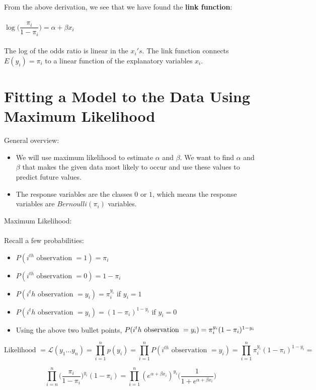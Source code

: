 \documentclass[12pt,timesnewroman,letterpaper]{article}
\begin{document}
\noindent From the above derivation, we see that we have found the \textbf{link function}:\\\\
$\log\big(\dfrac{\pi_i}{1-\pi_i}\big) = \alpha + \beta x_i$
\\\\
The log of the odds ratio is linear in the ${x_i} 's$. The link function connects $E(y_i) = \pi_i$ to a linear function of the explanatory variables $x_i$.

\section{Fitting a Model to the Data Using Maximum Likelihood}
General overview:
\begin{itemize}
    \item We will use maximum likelihood to estimate $\alpha$ and $\beta$. We want to find $\alpha$ and $\beta$ that makes the given data most likely to occur and use these values to predict future values.
    \item The response variables are the classes $0$ or $1$, which means the response variables are $Bernoulli(\pi_i)$ variables.
\end{itemize}

\noindent Maximum Likelihood:
\\
\\
Recall a few probabilities:
\begin{itemize}
    \item $P(i^{th} \text{ observation } = 1) = \pi_i$
    \item $P(i^{th} \text{ observation } = 0) = 1 - \pi_i$
    \item $P(i^th \text{ observation } = y_i) = \pi_i^{y_i}$ if $y_i = 1$
    \item $P(i^th \text{ observation } = y_i) = (1-\pi_i)^{1-y_i}$ if $y_i = 0$
    \item Using the above two bullet points, $P(i^th \text{ observation } = y_i) =\\ \pi_i^{y_i}(1-\pi_i)^{1-y_i}$
\end{itemize}

$$
\text{Likelihood } = \mathscr{L}(y_1 \ldots y_n) = \prod_{i=1}^{n} p(y_i) = \prod_{i=1}^n P(i^{th} \text{ observation } = y_i) = \prod_{i=1}^n \pi_i^{y_i}(1-\pi_i)^{1-y_i} = 
$$

$$\prod_{i=n}^n \big(\dfrac{\pi_i}{1-\pi_i}\big)^{y_i}(1-\pi_i) = \prod_{i=1}^n (e^{\alpha + \beta x_i})^{y_i}\big(\dfrac{1}{1 + e^{\alpha + \beta x_i}}\big)$$
\end{document}
